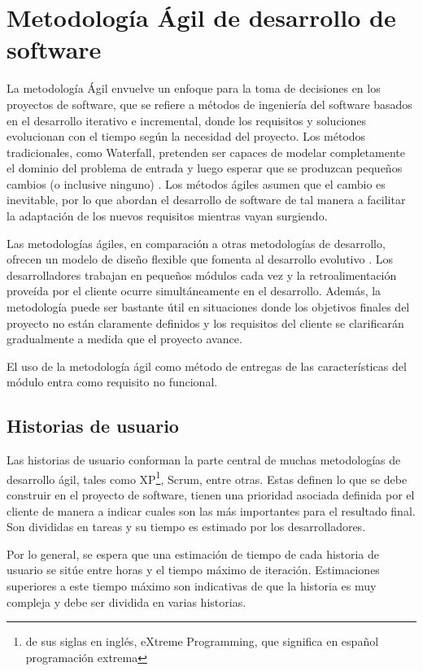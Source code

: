 \section{Metodología Ágil de desarrollo de software}
La metodología Ágil envuelve un enfoque para la toma de decisiones en los proyectos de software, que se refiere a métodos de ingeniería del software basados en el desarrollo iterativo e incremental, donde los requisitos y soluciones evolucionan con el tiempo según la necesidad del proyecto. Los métodos tradicionales, como Waterfall, pretenden ser capaces de modelar completamente el dominio del problema de entrada y luego esperar que se produzcan pequeños cambios (o inclusive ninguno) \citep{davis_agile_2015}. Los métodos ágiles asumen que el cambio es inevitable, por lo que abordan el desarrollo de software de tal manera a facilitar la adaptación de los nuevos requisitos mientras vayan surgiendo.

Las metodologías ágiles, en comparación a otras metodologías de desarrollo, ofrecen un modelo de diseño flexible que fomenta al desarrollo evolutivo \citep{leffingwell2010agile}. Los desarrolladores trabajan en pequeños módulos cada vez y la retroalimentación proveída por el cliente ocurre simultáneamente en el desarrollo. Además, la metodología puede ser bastante útil en situaciones donde los objetivos finales del proyecto no están claramente definidos y los requisitos del cliente se clarificarán gradualmente a medida que el proyecto avance.

El uso de la metodología ágil como método de entregas de las características del módulo entra como requisito no funcional.

\subsection{Historias de usuario}
Las historias de usuario conforman la parte central de muchas metodologías de desarrollo ágil, tales como XP\footnote{de sus siglas en inglés, eXtreme Programming, que significa en español programación extrema}, Scrum, entre otras. Estas definen lo que se debe construir en el proyecto de software, tienen una prioridad asociada definida por el cliente de manera a indicar cuales son las más importantes para el resultado final. Son divididas en tareas y su tiempo es estimado por los desarrolladores.

Por lo general, se espera que una estimación de tiempo de cada historia de usuario se sitúe entre horas y el tiempo máximo de iteración. Estimaciones superiores a este tiempo máximo son indicativas de que la historia es muy compleja y debe ser dividida en varias historias.

